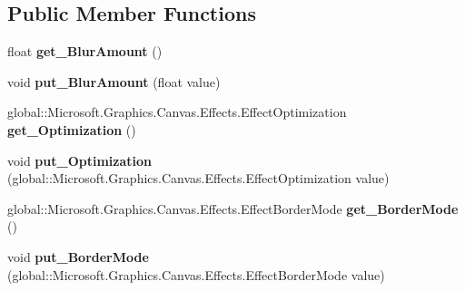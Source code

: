 \subsection*{Public Member Functions}
\begin{DoxyCompactItemize}
\item 
\mbox{\label{interface_microsoft_1_1_graphics_1_1_canvas_1_1_effects_1_1_i_gaussian_blur_effect_a88a386d562a3ed84bdcebfeffa5d35c0}} 
float {\bfseries get\+\_\+\+Blur\+Amount} ()
\item 
\mbox{\label{interface_microsoft_1_1_graphics_1_1_canvas_1_1_effects_1_1_i_gaussian_blur_effect_a977d2c3c0ddaac5ffbbedae24b0a0770}} 
void {\bfseries put\+\_\+\+Blur\+Amount} (float value)
\item 
\mbox{\label{interface_microsoft_1_1_graphics_1_1_canvas_1_1_effects_1_1_i_gaussian_blur_effect_a2d4f490b0296608bf9c8cd9d42125733}} 
global\+::\+Microsoft.\+Graphics.\+Canvas.\+Effects.\+Effect\+Optimization {\bfseries get\+\_\+\+Optimization} ()
\item 
\mbox{\label{interface_microsoft_1_1_graphics_1_1_canvas_1_1_effects_1_1_i_gaussian_blur_effect_a9ea1c87990030f61d07b28648580ea03}} 
void {\bfseries put\+\_\+\+Optimization} (global\+::\+Microsoft.\+Graphics.\+Canvas.\+Effects.\+Effect\+Optimization value)
\item 
\mbox{\label{interface_microsoft_1_1_graphics_1_1_canvas_1_1_effects_1_1_i_gaussian_blur_effect_a9070edd9d76886803e481852cc79fe7a}} 
global\+::\+Microsoft.\+Graphics.\+Canvas.\+Effects.\+Effect\+Border\+Mode {\bfseries get\+\_\+\+Border\+Mode} ()
\item 
\mbox{\label{interface_microsoft_1_1_graphics_1_1_canvas_1_1_effects_1_1_i_gaussian_blur_effect_a206e8f9a37a96c96af289283beac798d}} 
void {\bfseries put\+\_\+\+Border\+Mode} (global\+::\+Microsoft.\+Graphics.\+Canvas.\+Effects.\+Effect\+Border\+Mode value)

\end{DoxyCompactItemize}
